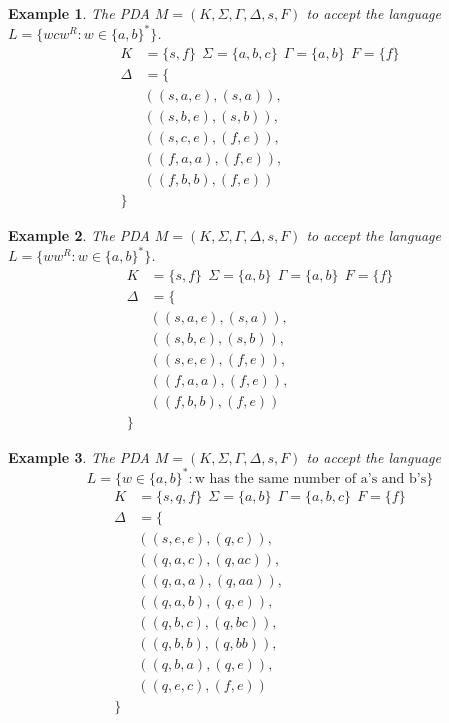 \documentclass[aps,pra,onecolumn,notitlepage,superscriptaddress]{revtex4-1}
\newtheorem{exa}{Example}
\begin{document}
    \begin{exa}
        The PDA $M = (K,\Sigma,\Gamma,\Delta,s,F)$ to accept the language $L = \{ wcw^R : w \in \{a,b\}^* \}$.
        \begin{align*}
            K &= \{s,f\} \ \ \Sigma = \{a,b,c\} \ \ \Gamma = \{a,b\} \ \ F = \{f\} \\
            \Delta &= \{ \\
                & ((s,a,e),(s,a)), \\
                & ((s,b,e),(s,b)), \\
                & ((s,c,e),(f,e)), \\
                & ((f,a,a),(f,e)), \\
                & ((f,b,b),(f,e)) \\
            \} &
        \end{align*}
    \end{exa}

    \begin{exa}
        The PDA $M = (K,\Sigma,\Gamma,\Delta,s,F)$ to accept the language $L = \{ ww^R : w \in \{a,b\}^* \}$.
        \begin{align*}
            K &= \{s,f\} \ \ \Sigma = \{a,b\} \ \ \Gamma = \{a,b\} \ \ F = \{f\} \\
            \Delta &= \{ \\
                & ((s,a,e),(s,a)), \\
                & ((s,b,e),(s,b)), \\
                & ((s,e,e),(f,e)), \\
                & ((f,a,a),(f,e)), \\
                & ((f,b,b),(f,e)) \\
            \} &
        \end{align*}
    \end{exa}

    \begin{exa}
        The PDA $M = (K,\Sigma,\Gamma,\Delta,s,F)$ to accept the language 
        \begin{equation*}
            L = \{ w \in \{a,b\}^* : \text{w has the same number of a's and b's} \}
        \end{equation*}
        \begin{align*}
            K &= \{s,q,f\} \ \ \Sigma = \{a,b\} \ \ \Gamma = \{a,b,c\} \ \ F = \{f\} \\
            \Delta &= \{ \\
                & ((s,e,e),(q,c)), \\
                & ((q,a,c),(q,ac)), \\
                & ((q,a,a),(q,aa)), \\
                & ((q,a,b),(q,e)), \\
                & ((q,b,c),(q,bc)), \\
                & ((q,b,b),(q,bb)), \\
                & ((q,b,a),(q,e)), \\
                & ((q,e,c),(f,e)) \\
            \} &
        \end{align*}
    \end{exa}
\end{document}
